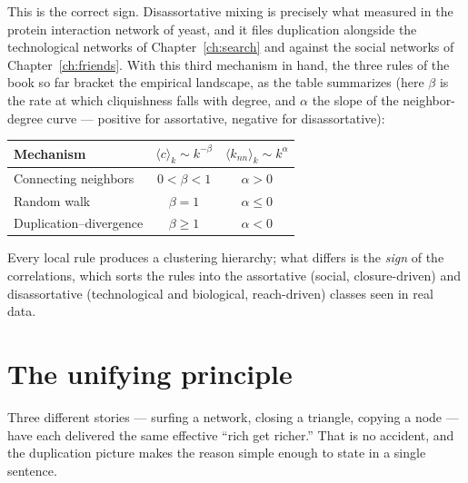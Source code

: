 This is the correct sign. Disassortative mixing is precisely what
\citet{maslov2002} measured in the protein interaction network of yeast, and it
files duplication alongside the technological networks of
Chapter~\ref{ch:search} and against the social networks of
Chapter~\ref{ch:friends}. With this third mechanism in hand, the three rules of
the book so far bracket the empirical landscape, as the table summarizes (here
$\beta$ is the rate at which cliquishness falls with degree, and $\alpha$ the
slope of the neighbor-degree curve --- positive for assortative, negative for
disassortative):
\begin{center}
\begin{tabular}{lcc}
\hline
Mechanism & $\langle c\rangle_k \sim k^{-\beta}$ & $\langle k_{nn}\rangle_k \sim k^{\alpha}$ \\
\hline
Connecting neighbors    & $0 < \beta < 1$ & $\alpha > 0$ \\
Random walk             & $\beta = 1$     & $\alpha \le 0$ \\
Duplication--divergence & $\beta \ge 1$   & $\alpha < 0$ \\
\hline
\end{tabular}
\end{center}
Every local rule produces a clustering hierarchy; what differs is the \emph{sign}
of the correlations, which sorts the rules into the assortative (social,
closure-driven) and disassortative (technological and biological, reach-driven)
classes seen in real data.

\section{The unifying principle}

Three different stories --- surfing a network, closing a triangle, copying a node
--- have each delivered the same effective ``rich get richer.'' That is no
accident, and the duplication picture makes the reason simple enough to state in
a single sentence.

